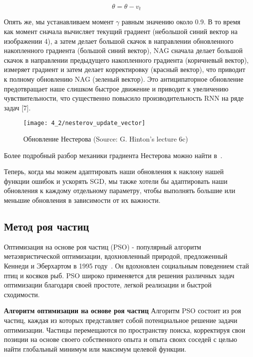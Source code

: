 \begin{equation*}
\theta = \theta - v_t
\end{equation*}

Опять же, мы устанавливаем момент $\gamma$ равным значению около 0.9.
В то время как момент сначала вычисляет текущий
градиент (небольшой синий вектор на изображении 4),
а затем делает большой скачок в направлении обновленного
накопленного градиента (большой синий вектор), NAG сначала делает
большой скачок в направлении предыдущего накопленного градиента
(коричневый вектор), измеряет градиент и затем делает корректировку
(красный вектор), что приводит к полному обновлению NAG (зеленый вектор).
Это антиципаторное обновление предотвращает
наше слишком быстрое движение и приводит к увеличению чувствительности,
что существенно повысило производительность RNN на ряде задач [7].

\begin{figure}[h!]
    \centering
    {\texttt{[image: 4\_2/nesterov\_update\_vector]} }
    \caption{Обновление Нестерова (Source: G. Hinton's lecture 6c)}\label{fig:4_2:1}
\end{figure}

Более подробный разбор механики градиента Нестерова
можно найти в~\cite{Sutskever2013}.

Теперь, когда мы можем адаптировать наши обновления к наклону
нашей функции ошибок и ускорять SGD, мы также хотели бы адаптировать
наши обновления к каждому отдельному параметру, чтобы выполнять
большие или меньшие обновления в зависимости от их важности.


\subsection{Метод роя частиц}\label{subsec:ch4/sec2/stokhastic}
Оптимизация на основе роя частиц (PSO) - популярный алгоритм метаэвристической
оптимизации, вдохновленный природой, предложенный Кеннеди и Эберхартом
в 1995 году~\cite{kennedy1995}.
Он вдохновлен социальным поведением стай птиц и косяков рыб.
PSO широко применяется для решения различных задач оптимизации благодаря
своей простоте, легкой реализации и быстрой сходимости.

\textbf{Алгоритм оптимизации на основе роя частиц}
Алгоритм PSO состоит из роя частиц, каждая из которых представляет собой
потенциальное решение задачи оптимизации.
Частицы перемещаются по пространству поиска, корректируя свои позиции
на основе своего собственного опыта и опыта своих соседей с целью найти
глобальный минимум или максимум целевой функции.

